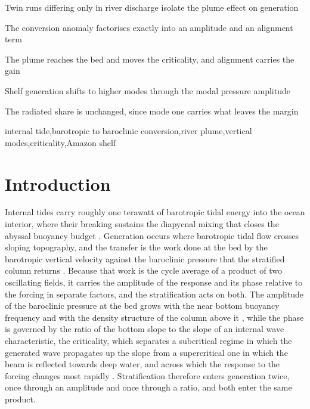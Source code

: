 \documentclass[a4paper,fleqn]{cas-sc}
\begin{document}
\begin{highlights}
\item Twin runs differing only in river discharge isolate the plume effect on generation
\item The conversion anomaly factorises exactly into an amplitude and an alignment term
\item The plume reaches the bed and moves the criticality, and alignment carries the gain
\item Shelf generation shifts to higher modes through the modal pressure amplitude
\item The radiated share is unchanged, since mode one carries what leaves the margin
\end{highlights}

\begin{keywords}
internal tide\sep barotropic to baroclinic conversion\sep river plume\sep vertical modes\sep criticality\sep Amazon shelf
\end{keywords}


\maketitle 
\section{Introduction}

Internal tides carry roughly one terawatt of barotropic tidal energy into the ocean interior, where their breaking sustains the diapycnal mixing that closes the abyssal buoyancy budget \citep{munkwunsch:1998,egbertray:2000,wunsch2004vertical,whalen2020internal}. Generation occurs where barotropic tidal flow crosses sloping topography, and the transfer is the work done at the bed by the barotropic vertical velocity against the baroclinic pressure that the stratified column returns \citep{baines:1982,kelly:2010,zilberman:2009}. Because that work is the cycle average of a product of two oscillating fields, it carries the amplitude of the response and its phase relative to the forcing in separate factors, and the stratification acts on both. The amplitude of the baroclinic pressure at the bed grows with the near bottom buoyancy frequency and with the density structure of the column above it \citep{bell:1975,llewellynsmith:2002,nycander:2005}, while the phase is governed by the ratio of the bottom slope to the slope of an internal wave characteristic, the criticality, which separates a subcritical regime in which the generated wave propagates up the slope from a supercritical one in which the beam is reflected towards deep water, and across which the response to the forcing changes most rapidly \citep{baines:1982,garrett:2007,hall_2013,klymak:2011}. Stratification therefore enters generation twice, once through an amplitude and once through a ratio, and both enter the same product.
\end{document}
